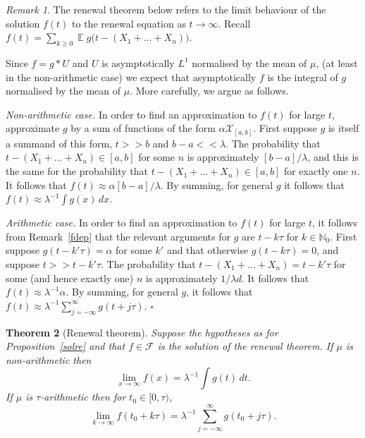 \documentclass[a4paper]{amsart}
\theoremstyle{plain}
\newtheorem{theorem}{Theorem}[section]
\theoremstyle{definition}
\theoremstyle{remark}
\newtheorem{remark}[theorem]{Remark}
\DeclareMathOperator{\expected}{\mathbb{E}}
\begin{document}
\begin{remark}\label{infpf}
  The renewal theorem below refers to the limit  behaviour of the solution $ f(t) $  to the renewal equation as $ t \to \infty $.
  Recall $ f(t) = \sum_{k\geq 0} \expected g\big(t-(X_1+\dots +X_n)\big) $.  
  
  Since $ f = g* U $ and $ U $ is asymptotically   $ L^1 $ normalised by the mean of $ \mu $, (at least in the non-arithmetic case) we expect that asymptotically $ f $ is the integral of $ g $ normalised by the mean of $ \mu $.  More carefully, we argue as follows.

\emph{Non-arithmetic case.} In order to find an approximation to $ f (t) $ for large $ t $, approximate $ g $ by a sum of functions of the form $ \alpha \mathcal{X} _{[a,b] } $.  First suppose $ g $ is itself a summand of this form, $ t >> b $ and $ b-a << \lambda $.  
The probability that $ t-(X_1+\dots +X_n) \in [a,b] $ for some $ n $ is approximately $ [b-a]/ \lambda $, and this is the same for the probability that $ t-(X_1+\dots +X_n) \in [a,b] $ for exactly one $ n $.  It follows that $ f(t) \approx  \alpha [b-a]/ \lambda $.  By summing, for general $ g $ it follows that $ f(t) \approx \lambda ^{-1} \int g(x)\, dx $. 

\emph{Arithmetic case.} In order to find an approximation to $ f (t) $ for large $ t $, it follows from  Remark~\ref{fdep}  that the relevant arguments for $ g $ are $ t-k\tau $ for $ k \in \mathbb{N} _0 $.  First suppose $ g ( t - k' \tau ) = \alpha $ for some $ k' $ and that otherwise $ g( t - k  \tau) = 0 $, and suppose $ t >> t-k'\tau$.  The probability that $ t - (X_1 + \dots + X_n ) = t - k'\tau $ for some (and hence exactly one) $ n $ is approximately $ 1/\lambda d$. It follows that $ f(t) \approx \lambda ^{-1} \alpha $.  By summing, for general $ g $, it follows that $ f(t) \approx \lambda ^{-1} \sum_{j=-\infty}^\infty g(t + j \tau )$.
    \hfill $\square$  \end{remark} 
    

\begin{theorem}[Renewal theorem] \label{renthm}  Suppose the hypotheses as for Proposition~\ref{solre} and that $ f \in \mathcal{F} $ is the solution of the renewal theorem.
If $ \mu $ is non-arithmetic then 
\begin{equation} \label{}
\lim_{x \to \infty } f(x) = \lambda ^{-1} \int g(t)\, dt  .
\end{equation}
If $ \mu $ is $ \tau$-arithmetic then for $ t_0 \in [0,\tau) $,
\begin{equation} \label{} 
\lim_{k\to \infty} f(t_0+ k\tau ) = \lambda ^{-1} \sum_{j=-\infty}^\infty g(t_0 + j \tau ).
\end{equation} 
\end{theorem}   
\end{document}
